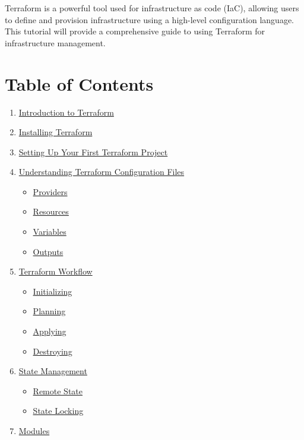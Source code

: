 \documentclass[
  letterpaper,
  DIV=11,
  numbers=noendperiod]{scrreprt}
\providecommand{\tightlist}{%
  \setlength{\itemsep}{0pt}\setlength{\parskip}{0pt}}\usepackage{longtable,booktabs,array}
\begin{document}
Terraform is a powerful tool used for infrastructure as code (IaC),
allowing users to define and provision infrastructure using a high-level
configuration language. This tutorial will provide a comprehensive guide
to using Terraform for infrastructure management.

\section{Table of Contents}\label{table-of-contents-23}

\begin{enumerate}
\def\labelenumi{\arabic{enumi}.}
\tightlist
\item
  \hyperref[introduction-to-terraform]{Introduction to Terraform}
\item
  \hyperref[installing-terraform]{Installing Terraform}
\item
  \hyperref[setting-up-your-first-terraform-project]{Setting Up Your
  First Terraform Project}
\item
  \hyperref[understanding-terraform-configuration-files]{Understanding
  Terraform Configuration Files}

  \begin{itemize}
  \tightlist
  \item
    \hyperref[providers]{Providers}
  \item
    \hyperref[resources]{Resources}
  \item
    \hyperref[variables]{Variables}
  \item
    \hyperref[outputs]{Outputs}
  \end{itemize}
\item
  \hyperref[terraform-workflow]{Terraform Workflow}

  \begin{itemize}
  \tightlist
  \item
    \hyperref[initializing]{Initializing}
  \item
    \hyperref[planning]{Planning}
  \item
    \hyperref[applying]{Applying}
  \item
    \hyperref[destroying]{Destroying}
  \end{itemize}
\item
  \hyperref[state-management]{State Management}

  \begin{itemize}
  \tightlist
  \item
    \hyperref[remote-state]{Remote State}
  \item
    \hyperref[state-locking]{State Locking}
  \end{itemize}
\item
  \hyperref[modules]{Modules}


\end{enumerate}
\end{document}
